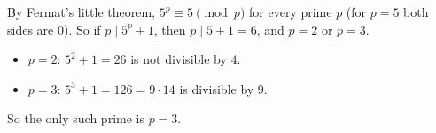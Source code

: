 By Fermat's little theorem, $5^p\equiv5\pmod p$ for every prime $p$ (for $p=5$ both sides are $0$). So if $p\mid5^p+1$, then $p\mid5+1=6$, and $p=2$ or $p=3$.
\begin{itemize}
\item $p=2$: $5^2+1=26$ is not divisible by $4$.
\item $p=3$: $5^3+1=126=9\cdot14$ is divisible by $9$.
\end{itemize}
So the only such prime is $p=\boxed{3}$.
